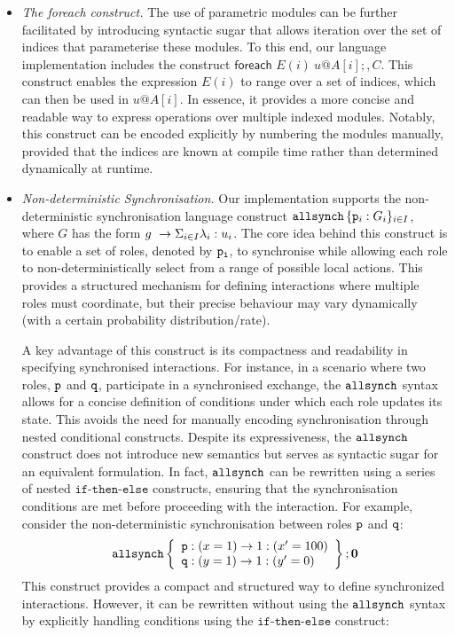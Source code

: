 \begin{itemize}
\item {\em The {\sf foreach} construct.} The use of parametric modules
  can be further facilitated by introducing syntactic sugar that
  allows iteration over the set of indices that parameterise these
  modules. To this end, our language implementation includes the
  construct $\textsf{foreach } E(i)\ u@A[i];, C$.   This construct enables the expression $E(i)$ to range
  over a set of indices, which can then be used in $u@A[i]$. In
  essence, it provides a more concise and readable way to express
  operations over multiple indexed modules. Notably, this construct
  can be encoded explicitly by numbering the modules manually,
  provided that the indices are known at compile time rather than
  determined dynamically at runtime.


\item {\em Non-deterministic Synchronisation.}  Our implementation
  supports the non-deterministic synchronisation language construct
  $\mathtt{allsynch}\, \{ {\mathtt{p}}_{i}:G_{i}\}_{i\in I}$, where $G$ has the form $g\ \rightarrow \Sigma_{i\in I}\lambda_i: u_i$. The core idea behind this construct is to enable a set of roles,
  denoted by $\mathtt{p_i}$, to synchronise while allowing each role to
  non-deterministically select from a range of possible local
  actions. This provides a structured mechanism for defining
  interactions where multiple roles must coordinate, but their precise
  behaviour may vary dynamically (with a certain probability
  distribution/rate).

  A key advantage of this construct is its compactness and readability
  in specifying synchronised interactions. For instance, in a scenario
  where two roles, $\mathtt{p}$ and $\mathtt{q}$, participate in a
  synchronised exchange, the $\mathtt{allsynch}$ syntax allows for a
  concise definition of conditions under which each role updates its
  state. This avoids the need for manually encoding synchronisation
  through nested conditional constructs.
  Despite its expressiveness, the $\mathtt{allsynch}$ construct does not
  introduce new semantics but serves as syntactic sugar for an
  equivalent formulation.  In fact, $\mathtt{allsynch}$ can be rewritten
  using a series of nested $\mathtt{if\text{-}then\text{-}else}$
  constructs, ensuring that the synchronisation conditions are met
  before proceeding with the interaction. For example, consider the
  non-deterministic synchronisation between roles $\mathtt{p}$ and
  $\mathtt{q}$: 
  \begin{displaymath}
    \mathtt{allsynch}\left\{
      \begin{array}{lll}
        \mathtt{p} : (x=1) \rightarrow 1 : (x'=100) \\
        \mathtt{q} : (y=1) \rightarrow 1 : (y'=0)
      \end{array}
    \right\} ; \mathbf{0}
  \end{displaymath}
  This construct provides a compact and structured way to define
  synchronized interactions. However, it can be rewritten without
  using the $\mathtt{allsynch}$ syntax by explicitly handling conditions
  using the $\mathtt{if\text{-}then\text{-}else}$ construct:
  

\end{itemize}
